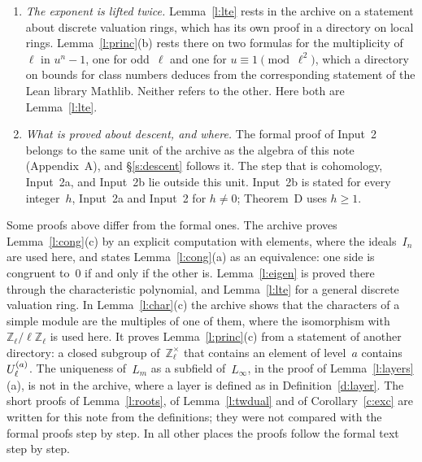 \documentclass[11pt,a4paper]{article}
\newcommand{\Z}{\mathbb{Z}}
\newcommand{\m}[1]{\mbox{$#1$}}        %
\theoremstyle{plainx}
\theoremstyle{uprightx}
\begin{document}
\begin{enumerate}[label=\textup{\arabic*.},leftmargin=1.6em,itemsep=5pt]
(Lemma~\ref{l:roots}(d)), which Input~3 needs when \m{\ell=2}; the archive lists this as a separate hypothesis of
Theorem~D and proves elsewhere that it is implied (Lemma~\ref{l:rank}). That lemma is not
used by the five final theorems: none of them reaches it in the graph of dependencies of the archive.
\item \emph{The exponent is lifted twice.} Lemma~\ref{l:lte} rests in the archive on a statement about discrete
valuation rings, which has its own proof in a directory on local rings. Lemma~\ref{l:princ}(b) rests there on two
formulas for the multiplicity of~$\ell$ in \m{u^n-1}, one for odd~$\ell$ and one for \m{u\equiv1\pmod{\ell^2}},
which a directory on bounds for class numbers deduces from the corresponding statement of the Lean library Mathlib.
Neither refers to the other. Here both are Lemma~\ref{l:lte}.
\item \emph{What is proved about descent, and where.} The formal proof of Input~2 belongs to the same unit of the
archive as the algebra of this note (Appendix~A), and §\ref{s:descent} follows it. The step that is cohomology,
Input~2a, and Input~2b lie outside this unit. Input~2b is stated for every integer~$h$, Input~2a and Input~2 for \m{h\ne0};
Theorem~D uses \m{h\ge1}.
\end{enumerate}

Some proofs above differ from the formal ones. The archive proves Lemma~\ref{l:cong}(c) by an explicit
computation with elements, where the ideals~$I_n$ are used here, and states Lemma~\ref{l:cong}(a) as an
equivalence: one side is congruent to~$0$ if and only if the other is. Lemma~\ref{l:eigen} is proved there through
the characteristic polynomial, and Lemma~\ref{l:lte} for a general discrete valuation ring. In
Lemma~\ref{l:char}(c) the archive shows that the characters of a simple module are the multiples of one of them,
where the isomorphism with \m{\Z_\ell/\ell\Z_\ell} is used here. It proves Lemma~\ref{l:princ}(c) from a statement
of another directory: a closed subgroup of~$\Z_\ell^\times$ that contains an element of level~$a$
contains~$U_{\ell}^{(a)}$. The uniqueness of~$L_m$ as a subfield of~$L_\infty$, in the proof of
Lemma~\ref{l:layers}(a), is not in the archive, where a layer is defined as in Definition~\ref{d:layer}. The short
proofs of Lemma~\ref{l:roots}, of Lemma~\ref{l:twdual} and of Corollary~\ref{c:exc} are written for this note from
the definitions; they were not compared with the formal proofs step by step. In all other places the proofs follow
the formal text step by step.
\end{document}
